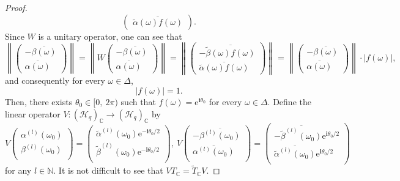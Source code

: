 \documentclass[pdflatex,sn-mathphys-num]{sn-jnl}%
\theoremstyle{thmstyleone}%
\theoremstyle{thmstyletwo}%
\theoremstyle{thmstylethree}%
\theoremstyle{definition}
\theoremstyle{remark}
\begin{document}
\begin{proof}
$$\begin{pmatrix}
    	\overline{\widetilde{\alpha}(\omega)f(\omega)}
    \end{pmatrix}.
$$
    Since $W$ is a unitary operator, one can see that
    \[
     \left\|\begin{pmatrix}
     	-\overline{\beta(\omega)} \\
     	\overline{\alpha(\omega)}
     \end{pmatrix} \right\|=\left\|W\begin{pmatrix}
     -\overline{\beta(\omega)} \\
     \overline{\alpha(\omega)}
 \end{pmatrix} \right\|=\left\|\begin{pmatrix}
 -\overline{\widetilde{\beta}(\omega)f(\omega)} \\
 \overline{\widetilde{\alpha}(\omega)f(\omega)}
\end{pmatrix} \right\|=\left\|\begin{pmatrix}
-\overline{\beta(\omega)} \\
\overline{\alpha(\omega)}
\end{pmatrix} \right\|\cdot|f(\omega)|,
    \]
  and consequently for every $\omega\in\Delta$,
    \[
    |f(\omega)|=1.
    \]
   Then, there exists $\theta_0\in[0,\ 2\pi)$ such that
    $f(\omega)=\mathrm{e}^{\boldsymbol{i}\theta_0}$ for every $\omega\in\Delta$. Define the linear operator $V:(\mathcal{H}_q)_{\mathbb{C}}\rightarrow(\mathcal{H}_q)_{\mathbb{C}}$ by
    $$
    V
    \begin{pmatrix}
    \alpha^{(l)}(\omega_0) \\
    \beta^{(l)}(\omega_0) \\
    \end{pmatrix}
    =\begin{pmatrix}
    \widetilde{\alpha}^{(l)}(\omega_0)\mathrm{e}^{-\boldsymbol{i}\theta_0/2} \\
    \widetilde{\beta}^{(l)}(\omega_0)\mathrm{e}^{-\boldsymbol{i}\theta_0/2} \\
    \end{pmatrix},\
    V
    \begin{pmatrix}
    -\overline{\beta^{(l)}(\omega_0)} \\
    \overline{\alpha^{(l)}(\omega_0)} \\
    \end{pmatrix}
    =\begin{pmatrix}
    -\overline{\widetilde{\beta}^{(l)}(\omega_0)}\mathrm{e}^{\boldsymbol{i}\theta_0/2} \\
    \overline{\widetilde{\alpha}^{(l)}(\omega_0)}\mathrm{e}^{\boldsymbol{i}\theta_0/2} \\
    \end{pmatrix}
    $$
    for any $l\in\mathbb{N}$. It is not difficult to see that $VT_{\mathbb{C}}=\widetilde{T}_{\mathbb{C}}V$.


\end{proof}
\end{document}

